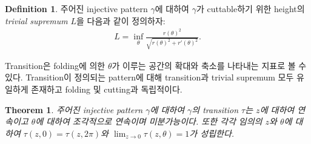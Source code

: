 \documentclass{amsart}
\theoremstyle{plain}
\newtheorem{theorem}{Theorem}[section]
\theoremstyle{definition}
\newtheorem*{definition}{Definition}
\theoremstyle{remark}
\begin{document}
\begin{definition}
주어진 injective pattern $\gamma$에 대하여 $\gamma$가 cuttable하기 위한 height의 {\it trivial supremum} $L$을 다음과 같이 정의하자:
\begin{align*}
L=\inf_{\theta}\frac{r(\theta)^2}{\sqrt{r(\theta)^2+r'(\theta)^2}}.
\end{align*}
\end{definition}

Transition은 folding에 의한 $\theta$가 이루는 공간의 확대와 축소를 나타내는 지표로 볼 수 있다.
Transition이 정의되는 pattern에 대해 transition과 trivial supremum 모두 유일하게 존재하고 folding 및 cutting과 독립적이다.

\begin{theorem}%
주어진 injective pattern $\gamma$에 대하여 $\gamma$의 transition $\tau$는 $z$에 대하여 연속이고 $\theta$에 대하여 조각적으로 연속이며 미분가능이다.
또한 각각 임의의 $z$와 $\theta$에 대하여 $\tau(z,0)=\tau(z,2\pi)$와 $\lim_{z\to0}\tau(z,\theta)=1$가 성립한다.
\end{theorem}





\iffalse
\begin{theorem}
주어진 injective pattern $\gamma$를 생각하자. 양의 실수 $Z<L$가 존재하여 구간 $(0,Z)$ 안의 모든 $z$에 대하여 $\tau(z,\theta)$는 상수함수일 수 없고 증가함수일 필요충분조건은 $|r'(\theta)|<r(\theta)$이다.
\end{theorem}

\begin{proof}
한 변 $\varphi(\Delta r)$을 공유하는 두 삼각형 $T$와 $T^*$를 같은 평면 위에 놓고자 한다.
공간에서 변 $\varphi(\Delta r)$의 위치를 고정시킨 $T^*$의 합동변환은 $\varphi(\Delta r)$를 축으로 하는 회전변환이다.
이 회전변환에 의한 삼각형 $T^*$의 상들 중 삼각형 $T$와 같은 평면에 있는 삼각형은 두 개이다.
이 두 삼각형 중 $\varphi(\Delta r)$을 기준으로 $T$와 같은 쪽에 있는 삼각형을 $T'$라 하자.
이 회전변환에 의해 점 $O$가 이동한 점들은 항상 직선 $\varphi(\Delta r)$에 수직이고 $z$축을 포함하는 평면 위에 있고 이 점들 중 삼각형 $T$와 같은 평면에 있는 점 두 개중 $T'$의 꼭짓점이 되는 하나를 $O'$라 하면 두 점 $\varphi(O)$와 $O'$을 지나는 직선은 $\varphi(\Delta r)$에 수직이다.

삼각형 $T$를 평면 $U$에 정사영시키는 과정에서 넓이 및 길이가 축소되기 때문에 직선 $\varphi(\Delta r)$부터 $\varphi(O)$까지의 거리보다 $O'$까지의 거리가 더 짧고 height $z$의 값이 커질수록 정사영에 의한 축소 효과는 커지므로 두 거리 사이의 차 또한 커진다.
$\Delta\theta$가 $0$에 가까워질 때 삼각형 $T$의 외접원 내부에 $O'$가 존재하면 $\Delta\theta<\Delta\theta^*$이므로 $\tau=\Delta\theta^*/\Delta\theta$가 증가하고  점 $O$가 $\varphi(\Delta r)$ 쪽으로 충분히 작은 거리를 이동하여 외접원 내에 있을 필요충분조건은 $r(\theta)>\sqrt2 z$이다.
이를 식 (\ref{r'})에 대입하면 $|r'(\theta)|<r(\theta)$를 얻는다.
\end{proof}
\fi
\end{document}
